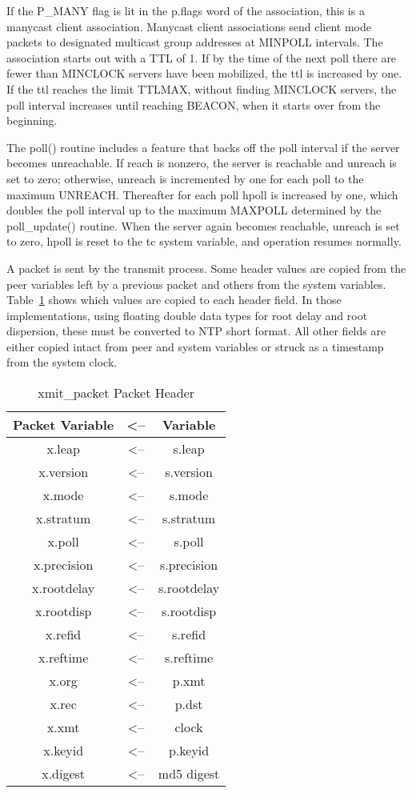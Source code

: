 If the P\_MANY flag is lit in the p.flags word of the association,
this is a manycast client association.  Manycast client associations
send client mode packets to designated multicast group addresses at
MINPOLL intervals.  The association starts out with a TTL of 1.  If
by the time of the next poll there are fewer than MINCLOCK servers
have been mobilized, the ttl is increased by one.  If the ttl reaches
the limit TTLMAX, without finding MINCLOCK servers, the poll interval
increases until reaching BEACON, when it starts over from the
beginning.

The poll() routine includes a feature that backs off the poll
interval if the server becomes unreachable.  If reach is nonzero, the
server is reachable and unreach is set to zero; otherwise, unreach is
incremented by one for each poll to the maximum UNREACH.  Thereafter
for each poll hpoll is increased by one, which doubles the poll
interval up to the maximum MAXPOLL determined by the poll\_update()
routine.  When the server again becomes reachable, unreach is set to
zero, hpoll is reset to the tc system variable, and operation resumes
normally.

A packet is sent by the transmit process.  Some header values are
copied from the peer variables left by a previous packet and others
from the system variables.  Table~\ref{xmit_packet_packet_header} shows which values are copied
to each header field.  In those implementations, using floating
double data types for root delay and root dispersion, these must be
converted to NTP short format.  All other fields are either copied
intact from peer and system variables or struck as a timestamp from
the system clock.

\begin{table}[htb]
\center
\begin{tabular}{c | c | c}
Packet Variable & <-- & Variable \\
\hline
\hline
x.leap      & <-- & s.leap      \\
x.version   & <-- & s.version   \\
x.mode      & <-- & s.mode      \\
x.stratum   & <-- & s.stratum   \\
x.poll      & <-- & s.poll      \\
x.precision & <-- & s.precision \\
x.rootdelay & <-- & s.rootdelay \\
x.rootdisp  & <-- & s.rootdisp  \\
x.refid     & <-- & s.refid     \\
x.reftime   & <-- & s.reftime   \\
x.org       & <-- & p.xmt       \\
x.rec       & <-- & p.dst       \\
x.xmt       & <-- & clock       \\
x.keyid     & <-- & p.keyid     \\
x.digest    & <-- & md5 digest  \\
\hline
\end{tabular}
\label{xmit_packet_packet_header}
\caption{xmit\_packet Packet Header}
\end{table}

